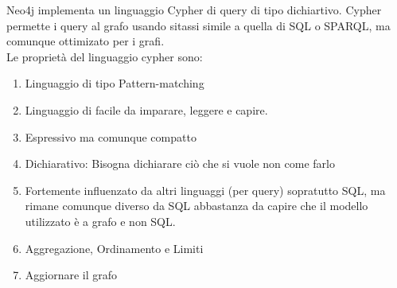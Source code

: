 \documentclass[a4page, 11pt]{article}
\begin{document}
Neo4j implementa un linguaggio Cypher di query di tipo dichiartivo. Cypher permette i query al grafo usando sitassi simile a quella di SQL o SPARQL, ma comunque ottimizato per i grafi.\\
Le proprietà del linguaggio cypher sono:

\begin{enumerate}[noitemsep]
	 
	\item
	Linguaggio di tipo Pattern-matching
	\item
	Linguaggio di facile da imparare, leggere e capire.
	\item
	Espressivo ma comunque compatto
	\item
	Dichiarativo: Bisogna dichiarare ciò che si vuole non come farlo
	\item
	Fortemente influenzato da altri linguaggi (per query) sopratutto SQL, ma rimane comunque diverso da SQL abbastanza da capire che il modello utilizzato è a grafo e non SQL.
	\item
	Aggregazione, Ordinamento e Limiti
	\item
	Aggiornare il grafo
\end{enumerate}
\end{document}
